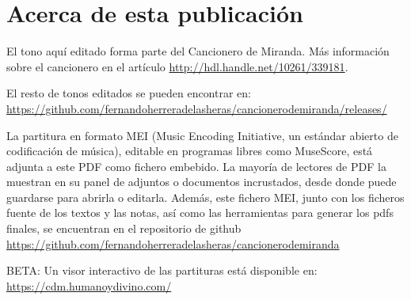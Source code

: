 
\section*{\centering\LARGE{Acerca de esta publicación}}

\vspace{0.5cm}




\vspace{0.5cm}

El tono aquí editado forma parte del Cancionero de Miranda. Más información sobre el cancionero en el artículo \url{http://hdl.handle.net/10261/339181}.

\vspace{0.5cm}

El resto de tonos editados se pueden encontrar en: \url{https://github.com/fernandoherreradelasheras/cancionerodemiranda/releases/}

\vspace{0.5cm}

La partitura en formato MEI (Music Encoding Initiative, un estándar abierto de codificación de música), editable en programas libres como MuseScore, está adjunta a este PDF como fichero embebido. La mayoría de lectores de PDF la muestran en su panel de adjuntos o documentos incrustados, desde donde puede guardarse para abrirla o editarla. Además, este fichero MEI, junto con los ficheros fuente de los textos y las notas, así como las herramientas para generar los pdfs finales, se encuentran en el repositorio de github \url{https://github.com/fernandoherreradelasheras/cancionerodemiranda}

\vspace{0.5cm}

BETA: Un visor interactivo de las partituras está disponible en: \url{https://cdm.humanoydivino.com/} 




